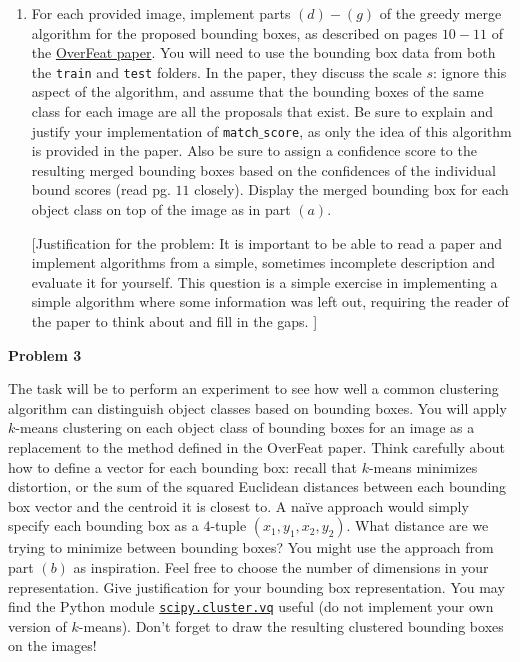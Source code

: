 \documentclass[12pt]{article}
\newcommand{\probnum}[1]
{\large {\bf Problem {#1}}}
\begin{document}
\begin{enumerate}
\item For each provided image, implement parts $(d)-(g)$ of the greedy merge algorithm for the proposed bounding boxes, as described on pages $10-11$ of the \href{http://arxiv.org/pdf/1312.6229v4.pdf}{OverFeat paper}. You will need to use the bounding box data from both the \texttt{train} and \texttt{test} folders. In the paper, they discuss the scale $s$: ignore this aspect of the algorithm, and assume that the bounding boxes of the same class for each image are all the proposals that exist. Be sure to explain and justify your implementation of \texttt{match$\_$score}, as only the idea of this algorithm is provided in the paper. Also be sure to assign a confidence score to the resulting merged bounding boxes based on the confidences of the individual bound scores (read pg. $11$ closely). Display the merged bounding box for each object class on top of the image as in part $(a)$.

[Justification for the problem: It is important to be able to read a paper and implement algorithms from a simple, sometimes incomplete description and evaluate it for yourself. This question is a simple exercise in implementing a simple algorithm where some information was left out, requiring the reader of the paper to think about and fill in the gaps. ]

\end{enumerate}

\probnum{3}

The task will be to perform an experiment to see how well a common clustering algorithm can distinguish object classes based on bounding boxes. You will apply $k$-means clustering on each object class of bounding boxes for an image as a replacement to the method defined in the OverFeat paper. Think carefully about how to define a vector for each bounding box: recall that $k$-means minimizes distortion, or the sum of the squared Euclidean distances between each bounding box vector and the centroid it is closest to. A na{\"i}ve approach would simply specify each bounding box as a $4$-tuple $(x_1, y_1, x_2, y_2)$. What distance are we trying to minimize between bounding boxes? You might use the approach from part $(b)$ as inspiration. Feel free to choose the number of dimensions in your representation. Give justification for your bounding box representation. You may find the Python module \href{http://docs.scipy.org/doc/scipy/reference/cluster.vq.html}{\texttt{scipy.cluster.vq}} useful (do not implement your own version of $k$-means). Don't forget to draw the resulting clustered bounding boxes on the images!
\end{document}

